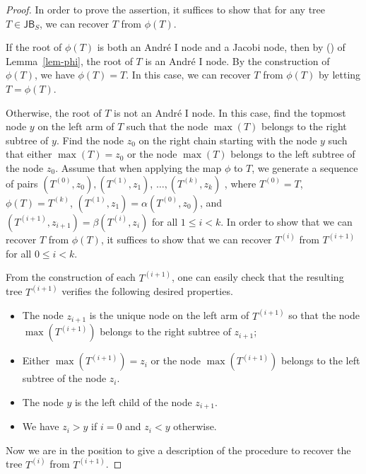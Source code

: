 \documentclass[10pt,a4paper]{amsart}
\def\JB{\mathsf{JB}}
\newcommand{\rmnum}[1]{\romannumeral #1}
\begin{document}
   	 	\begin{proof}
   	 		
   	 		In order to prove the assertion, it  suffices to  show that for any tree $T\in \JB_S$, we can recover $T$ from $\phi(T)$.   
   	 		
   	 		
   	 		If the root of $\phi(T)$ is both   an Andr\'e   $\mathrm{I}$  node and a Jacobi node, then 
   	 		by (\rmnum{2}) of Lemma~\ref{lem-phi},  the root of $T$ is an Andr\'e  $\mathrm{I}$  node.  By the construction of $\phi(T)$, we have $\phi(T)=T$. In this case, we can recover $T$ from $\phi(T)$ by letting $T=\phi(T)$.  
   	 		
   	 		
   	 		Otherwise,  the root of $T$ is not an Andr\'e   $\mathrm{I}$  node.  In this case,   find the topmost node $y$ on the left arm of $T$  such that the node $\max(T)$  belongs to the right subtree of  $y$.      
   	 		Find the node $z_0$ on the right chain starting with the node $y$ such that either $\max(T)=z_0$ or  the node $\max(T)$ belongs to the left subtree of the node $z_0$. Assume that when applying the map $\phi$ to $T$, we generate a sequence  of pairs $(T^{(0)}, z_0), (T^{(1)}, z_1)$, $\ldots, (T^{(k)}, z_k)$ , where $T^{(0)}=T$, $\phi(T)=T^{(k)}$, $(T^{(1)}, z_1)=\alpha(T^{(0)}, z_0)$, and  $(T^{(i+1)}, z_{i+1})=\beta(T^{(i)}, z_i)$ for all $1\leq i<k$.  In order to show that  we can recover $T$ from $\phi(T)$, it suffices to show that we can recover   $T^{(i)}$ from    $T^{(i+1)}$ for all $0\leq i<k$.   
   	 		
   	 		
   	 		From the construction of each $T^{(i+1)}$,  one can easily check that the resulting tree $T^{(i+1)}$ verifies the following desired properties. 
   	 		\begin{itemize}
   	 			\item[\upshape{(\rmnum{1})}]  The node $z_{i+1}$ is the unique  node 
   	 			on the left arm of $T^{(i+1)}$ so that the node $\max(T^{(i+1)})$ belongs to the right subtree of $z_{i+1}$;
   	 			\item[\upshape{(\rmnum{2})}]   Either $\max(T^{(i+1)})=z_i$ or the node $\max(T^{(i+1)})$ belongs to the left subtree of the node $z_i$. 
   	 			\item[\upshape{(\rmnum{3})}]  The node $y$ is the left child of the node $z_{i+1}$.
   	 			\item[\upshape{(\rmnum{4})}] We have $z_i>y$ if $i=0$ and $z_i<y$ otherwise. 
   	 		\end{itemize}
   	 		
   	 		Now we are in the position to give a description of the procedure to recover the
   	 		tree $T^{(i)}$ from $T^{(i+1)}$.  
   	 		

\end{proof}
\end{document}
